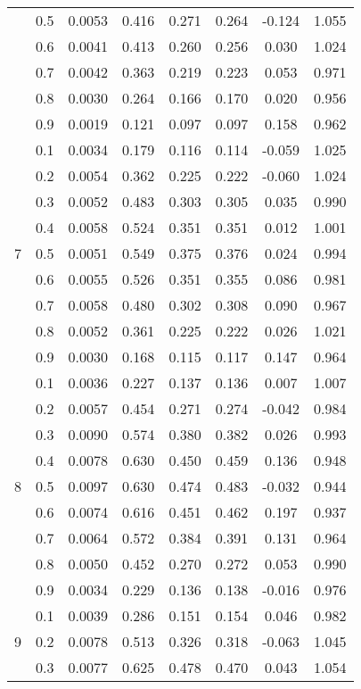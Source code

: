 \documentclass[11pt,a4paper]{report}
\begin{document}
\begin{longtable}{ | c | c || c | c | c | c | c | c | }
 & 0.5 & 0.0053 & 0.416 & 0.271 & 0.264 & -0.124 & 1.055 \\
 & 0.6 & 0.0041 & 0.413 & 0.260 & 0.256 & 0.030 & 1.024 \\
 & 0.7 & 0.0042 & 0.363 & 0.219 & 0.223 & 0.053 & 0.971 \\
 & 0.8 & 0.0030 & 0.264 & 0.166 & 0.170 & 0.020 & 0.956 \\
 & 0.9 & 0.0019 & 0.121 & 0.097 & 0.097 & 0.158 & 0.962 \\
 \hline
\multirow{9}{*}{7} & 0.1 & 0.0034 & 0.179 & 0.116 & 0.114 & -0.059 & 1.025 \\
 & 0.2 & 0.0054 & 0.362 & 0.225 & 0.222 & -0.060 & 1.024 \\
 & 0.3 & 0.0052 & 0.483 & 0.303 & 0.305 & 0.035 & 0.990 \\
 & 0.4 & 0.0058 & 0.524 & 0.351 & 0.351 & 0.012 & 1.001 \\
 & 0.5 & 0.0051 & 0.549 & 0.375 & 0.376 & 0.024 & 0.994 \\
 & 0.6 & 0.0055 & 0.526 & 0.351 & 0.355 & 0.086 & 0.981 \\
 & 0.7 & 0.0058 & 0.480 & 0.302 & 0.308 & 0.090 & 0.967 \\
 & 0.8 & 0.0052 & 0.361 & 0.225 & 0.222 & 0.026 & 1.021 \\
 & 0.9 & 0.0030 & 0.168 & 0.115 & 0.117 & 0.147 & 0.964 \\
 \hline
\multirow{9}{*}{8} & 0.1 & 0.0036 & 0.227 & 0.137 & 0.136 & 0.007 & 1.007 \\
 & 0.2 & 0.0057 & 0.454 & 0.271 & 0.274 & -0.042 & 0.984 \\
 & 0.3 & 0.0090 & 0.574 & 0.380 & 0.382 & 0.026 & 0.993 \\
 & 0.4 & 0.0078 & 0.630 & 0.450 & 0.459 & 0.136 & 0.948 \\
 & 0.5 & 0.0097 & 0.630 & 0.474 & 0.483 & -0.032 & 0.944 \\
 & 0.6 & 0.0074 & 0.616 & 0.451 & 0.462 & 0.197 & 0.937 \\
 & 0.7 & 0.0064 & 0.572 & 0.384 & 0.391 & 0.131 & 0.964 \\
 & 0.8 & 0.0050 & 0.452 & 0.270 & 0.272 & 0.053 & 0.990 \\
 & 0.9 & 0.0034 & 0.229 & 0.136 & 0.138 & -0.016 & 0.976 \\
 \hline
\multirow{9}{*}{9} & 0.1 & 0.0039 & 0.286 & 0.151 & 0.154 & 0.046 & 0.982 \\
 & 0.2 & 0.0078 & 0.513 & 0.326 & 0.318 & -0.063 & 1.045 \\
 & 0.3 & 0.0077 & 0.625 & 0.478 & 0.470 & 0.043 & 1.054 \\

\end{longtable}
\end{document}
